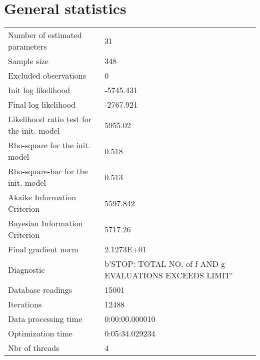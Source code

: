 


\section{General statistics}
\begin{tabular}{ll}
Number of estimated parameters & 31 \\
Sample size & 348 \\
Excluded observations & 0 \\
Init log likelihood & -5745.431 \\
Final log likelihood & -2767.921 \\
Likelihood ratio test for the init. model & 5955.02 \\
Rho-square for the init. model & 0.518 \\
Rho-square-bar for the init. model & 0.513 \\
Akaike Information Criterion & 5597.842 \\
Bayesian Information Criterion & 5717.26 \\
Final gradient norm & 2.1273E+01 \\
Diagnostic & b'STOP: TOTAL NO. of f AND g EVALUATIONS EXCEEDS LIMIT' \\
Database readings & 15001 \\
Iterations & 12488 \\
Data processing time & 0:00:00.000010 \\
Optimization time & 0:05:34.029234 \\
Nbr of threads & 4 \\
\end{tabular}

